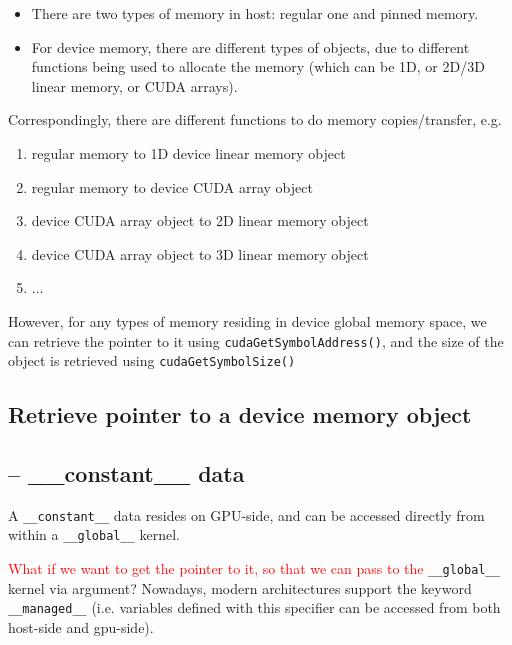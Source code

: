 \begin{framed}
  \begin{itemize}
  \item   There are two types of memory in host: regular one and pinned
    memory. 

  \item For device memory, there are different types of objects, due
    to different functions being used to allocate the memory (which
    can be 1D, or 2D/3D linear memory, or CUDA arrays).
  \end{itemize}

  Correspondingly, there are different functions to do memory
  copies/transfer, e.g. 
  \begin{enumerate}
  \item regular memory to 1D device linear memory object
  \item regular memory to device CUDA array object
  \item device CUDA array object to 2D linear memory object 
  \item device CUDA array object to 3D linear memory object 
  \item ...
  \end{enumerate}

  However, for any types of memory residing in device global memory
  space, we can retrieve the pointer to it using
  \verb!cudaGetSymbolAddress()!, and the size of the object is
  retrieved using \verb!cudaGetSymbolSize()!
\end{framed}

\subsection{Retrieve pointer to a device memory object}
\label{sec:retr-point-device}
\label{sec:cudaGetSymbolAddress}

\subsection{-- \_\_constant\_\_ data}

A \verb!__constant__! data resides on GPU-side, and can be accessed directly from within 
a \verb!__global__! kernel.

\textcolor{red}{What if we want to get the pointer to it, so that we can pass to
the} \verb!__global__! kernel via argument? Nowadays, modern architectures
support the keyword \verb!__managed__! (i.e. variables defined with this
specifier can be accessed from both host-side and gpu-side).

